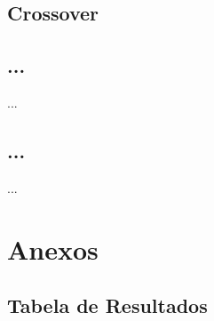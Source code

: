 \documentclass[a4paper]{article}
\begin{document}
\cleardoublepage
\subsection{Crossover}

\subsection{...}
\indent \indent ...

\cleardoublepage

\subsection{...}
\indent \indent ...

\cleardoublepage

\eject \pdfpagewidth=594.0mm \pdfpageheight=420.0mm
\paperwidth=594.0mm
\paperheight=420.0mm

\section{Anexos}

\subsection{Tabela de Resultados}
\begin{center}
	
\end{center}
\end{document}
